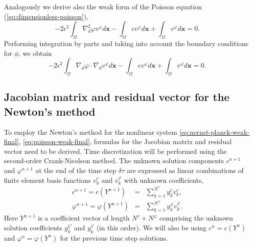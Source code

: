Analogously we derive also the weak form of the Poisson equation (\ref{eq:dimensionless-poisson}),
\begin{equation}
  -2\epsilon^2\int_{\Omega}\nabla_d^2\varphi v^\varphi d\mathbf{x}-\int_{\Omega}cv^\varphi d\mathbf{x}+
  \int_{\Omega}v^\varphi d\mathbf{x}=0.
  \label{eq:poisson-weak1}
\end{equation}
Performing integration by parts and taking into account the boundary 
conditions for $\phi$, we obtain
\begin{equation}
  -2\epsilon^2\int_{\Omega}\nabla_d\varphi\cdot\nabla_d v^\varphi d\mathbf{x}-\int_{\Omega}cv^\varphi d\mathbf{x}+
  \int_{\Omega}v^\varphi d\mathbf{x}=0.
  \label{eq:poisson-weak-final}
\end{equation}


\subsection{Jacobian matrix and residual vector for the Newton's method}
To employ the Newton's method for the nonlinear system \eqref{eq:nernst-planck-weak-final},
\eqref{eq:poisson-weak-final}, formulas for the Jacobian matrix and residual vector need to
be derived. Time discretization will be performed using the second-order Crank-Nicolson 
method. The unknown solution components 
$c^{n+1}$ and $\varphi^{n+1}$ at the end of the time step $\delta\tau$ are expressed 
as linear combinations of finite element basis functions $v_k^{c}$ 
and $v_k^{\varphi}$ with unknown coefficients,
\begin{eqnarray}
  c^{n+1} = c(Y^{n+1}) &=& \sum_{k=1}^{N^c} y_k^{c} v_k^{c}, \label{eq:cnotation}\\
  \varphi^{n+1} = \varphi(Y^{n+1}) &=& \sum_{k=1}^{N^{\varphi}} y_k^{\varphi} v_k^{\varphi}\label{eq:phinotation}.
\end{eqnarray}
Here $Y^{n+1}$ is a coefficient vector of length $N^c + N^{\varphi}$ comprising the unknown 
solution coefficients $y_k^{C}$ and $y_k^{\varphi}$ (in this order). We will also be 
using $c^n = c(Y^n)$ and $\varphi^n = \varphi(Y^n)$ for the previous time step solutions.

